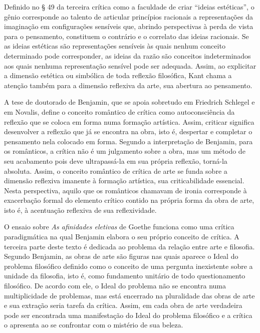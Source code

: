 Definido no § 49 da terceira crítica como a faculdade de criar ``ideias
estéticas'', o gênio corresponde ao talento de articular princípios
racionais a representações da imaginação em configurações sensíveis que,
abrindo perspectivas à perda de vista para o pensamento, constituem o
contrário e o correlato das ideias racionais. Se as ideias estéticas são
representações sensíveis às quais nenhum conceito determinado pode
corresponder, as ideias da razão são conceitos indeterminados aos quais
nenhuma representação sensível pode ser adequada. Assim, ao explicitar a
dimensão estética ou simbólica de toda reflexão filosófica, Kant chama a
atenção também para a dimensão reflexiva da arte, sua abertura ao
pensamento.

A tese de doutorado de Benjamin, que se apoia sobretudo em Friedrich
Schlegel e em Novalis, define o conceito romântico de crítica como
autoconsciência da reflexão que se coloca em forma numa formação
artística. Assim, criticar significa desenvolver a reflexão que já se
encontra na obra, isto é, despertar e completar o pensamento nela
colocado em forma. Segundo a interpretação de Benjamin, para os
românticos, a crítica não é um julgamento sobre a obra, mas um método de
seu acabamento pois deve ultrapassá-la em sua própria reflexão, torná-la
absoluta. Assim, o conceito romântico de crítica de arte se funda sobre
a dimensão reflexiva imanente à formação artística, sua criticabilidade
essencial. Nesta perspectiva, aquilo que os românticos chamavam de
ironia corresponde à exacerbação formal do elemento crítico contido na
própria forma da obra de arte, isto é, à acentuação reflexiva de sua
reflexividade.

O ensaio sobre \emph{As afinidades eletivas} de Goethe funciona como uma
crítica paradigmática na qual Benjamin elabora o seu próprio conceito de
crítica. A terceira parte deste texto é dedicada ao problema da relação
entre arte e filosofia. Segundo Benjamin, as obras de arte são figuras
nas quais aparece o Ideal do problema filosófico definido como o
conceito de uma pergunta inexistente sobre a unidade da filosofia, isto
é, como fundamento unitário de todo questionamento filosófico. De acordo
com ele, o Ideal do problema não se encontra numa multiplicidade de
problemas, mas está encerrado na pluralidade das obras de arte e sua
extração seria tarefa da crítica. Assim, em cada obra de arte verdadeira
pode ser encontrada uma manifestação do Ideal do problema filosófico e a
crítica o apresenta ao se confrontar com o mistério de sua beleza.

